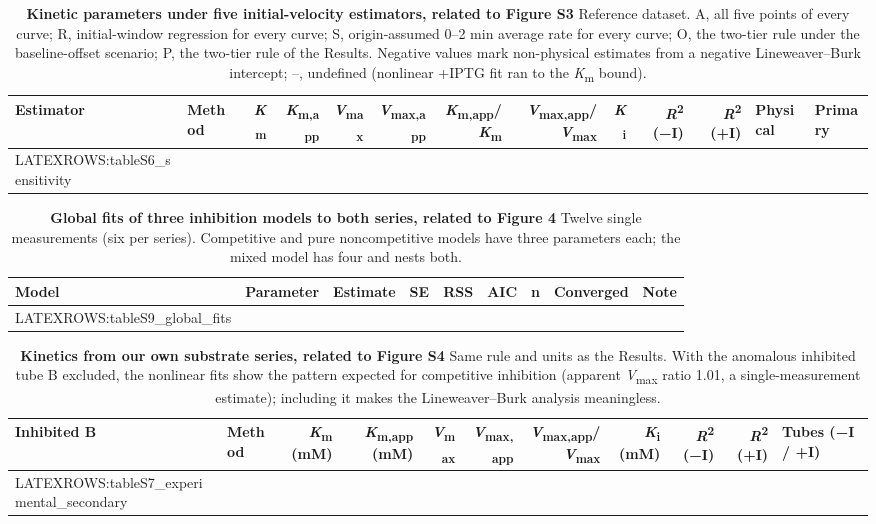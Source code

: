 \documentclass[9pt,twocolumn]{extarticle}
\newcommand{\Km}{\textit{K}\textsubscript{m}}
\newcommand{\Kmapp}{\textit{K}\textsubscript{m,app}}
\newcommand{\Vmax}{\textit{V}\textsubscript{max}}
\newcommand{\Vmaxapp}{\textit{V}\textsubscript{max,app}}
\newcommand{\Ki}{\textit{K}\textsubscript{i}}
\newcommand{\Rsq}{\textit{R}\textsuperscript{2}}
\newcommand{\dash}{–}
\begin{document}
\begin{table}[h]
\caption{\textbf{Kinetic parameters under five initial-velocity estimators, related to Figure S3}\newline
Reference dataset. A, all five points of every curve; R, initial-window regression for every curve; S, origin-assumed 0\dash 2 min average rate for every curve; O, the two-tier rule under the baseline-offset scenario; P, the two-tier rule of the Results. Negative values mark non-physical estimates from a negative Lineweaver\dash Burk intercept; –, undefined (nonlinear +IPTG fit ran to the \Km{} bound).}
\scriptsize
\begin{tabular}{@{}llrrrrrrrrrll@{}}
\toprule
Estimator & Method & \Km & \Kmapp & \Vmax & \Vmaxapp & \Kmapp/\Km & \Vmaxapp/\Vmax & \Ki & \Rsq{} (−I) & \Rsq{} (+I) & Physical & Primary \\
\midrule
{{LATEXROWS:tableS6_sensitivity}}
\bottomrule
\end{tabular}
\end{table}

\begin{table}[h]
\caption{\textbf{Global fits of three inhibition models to both series, related to Figure 4}\newline
Twelve single measurements (six per series). Competitive and pure noncompetitive models have three parameters each; the mixed model has four and nests both.}
\footnotesize
\begin{tabular}{@{}llrrrrrll@{}}
\toprule
Model & Parameter & Estimate & SE & RSS & AIC & n & Converged & Note \\
\midrule
{{LATEXROWS:tableS9_global_fits}}
\bottomrule
\end{tabular}
\end{table}

\begin{table}[h]
\caption{\textbf{Kinetics from our own substrate series, related to Figure S4}\newline
Same rule and units as the Results. With the anomalous inhibited tube B excluded, the nonlinear fits show the pattern expected for competitive inhibition (apparent \Vmax{} ratio 1.01, a single-measurement estimate); including it makes the Lineweaver\dash Burk analysis meaningless.}
\footnotesize
\begin{tabular}{@{}llrrrrrrrrl@{}}
\toprule
Inhibited B & Method & \Km{} (mM) & \Kmapp{} (mM) & \Vmax & \Vmaxapp & \Vmaxapp/\Vmax & \Ki{} (mM) & \Rsq{} (−I) & \Rsq{} (+I) & Tubes (−I / +I) \\
\midrule
{{LATEXROWS:tableS7_experimental_secondary}}
\bottomrule
\end{tabular}
\end{table}
\end{document}
